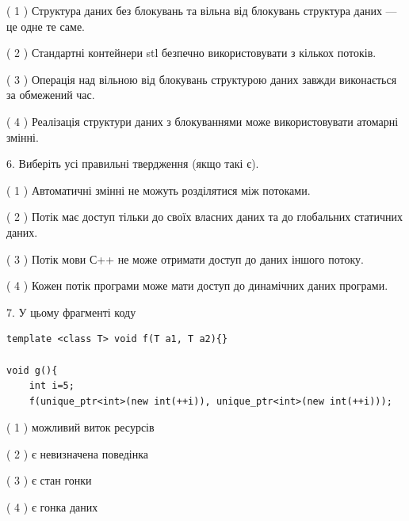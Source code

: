 \documentclass[12pt, ukrainian]{article}
\begin{document}
\begin {large}
{( 1 ) Структура даних без блокувань та вільна від блокувань структура даних --- це одне те саме.%

( 2 ) Стандартні контейнери stl безпечно використовувати з кількох потоків.%

( 3 ) Операція над вільною від блокувань структурою даних завжди виконається за обмежений час.%

( 4 ) Реалізація структури даних з блокуваннями може використовувати атомарні змінні.%
\newpage



\vspace{5mm}
6. Виберіть усі правильні твердження (якщо такі є).\par
\vspace{2mm}

( 1 ) Автоматичні змінні не можуть розділятися між потоками.%

( 2 ) Потік має доступ тільки до своїх власних даних та до глобальних статичних даних.%

( 3 ) Потік мови С++ не може отримати доступ до даних іншого потоку.%

( 4 ) Кожен потік програми може мати доступ до динамічних даних програми.%


\vspace{5mm}
7. У цьому фрагменті коду
\begin{verbatim}
template <class T> void f(T a1, T a2){}

void g(){
    int i=5;
    f(unique_ptr<int>(new int(++i)), unique_ptr<int>(new int(++i)));
\end{verbatim}

( 1 ) можливий виток ресурсів%

( 2 ) є невизначена поведінка%

( 3 ) є стан гонки%

( 4 ) є гонка даних%
}
\end {large}
\end{document}

